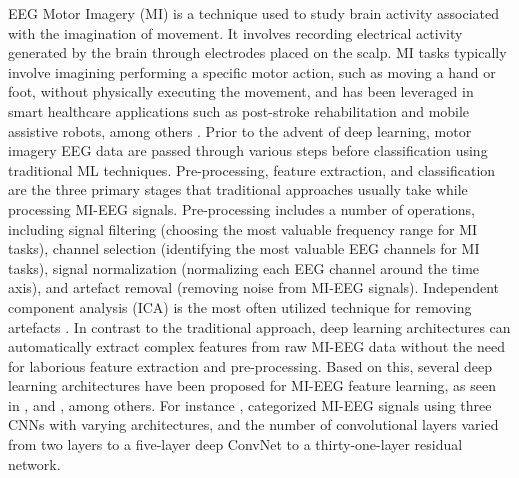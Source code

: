 \documentclass[preprint,12pt]{elsarticle}
\begin{document}
EEG Motor Imagery (MI) is a technique used to study brain activity associated with the imagination of movement. It involves recording electrical activity generated by the brain through electrodes placed on the scalp. MI tasks typically involve imagining performing a specific motor action, such as moving a hand or foot, without physically executing the movement, and has been leveraged in smart healthcare applications such as post-stroke rehabilitation and mobile assistive robots, among others \citep{altaheri2023deep}. Prior to the advent of deep learning, motor imagery EEG data are passed through various steps before classification using traditional ML techniques. Pre-processing, feature extraction, and classification are the three primary stages that traditional approaches usually take while processing MI-EEG signals. Pre-processing includes a number of operations, including signal filtering (choosing the most valuable frequency range for MI tasks), channel selection (identifying the most valuable EEG channels for MI tasks), signal normalization (normalizing each EEG channel around the time axis), and artefact removal (removing noise from MI-EEG signals). Independent component analysis (ICA) is the most often utilized technique for removing artefacts \citep{brunner2007spatial, delorme2007enhanced, jafarifarmand2019eeg}. In contrast to the traditional approach, deep learning architectures can automatically extract complex features from raw MI-EEG data without the need for laborious feature extraction and pre-processing. Based on this, several deep learning architectures have been proposed for MI-EEG feature learning, as seen in \citep{zhang2019novel}, \citep{kumar2016deep} and \citep{tibrewal2022}, among others. For instance \citep{Schirrmeister2017}, categorized MI-EEG signals using three CNNs with varying architectures, and the number of convolutional layers varied from two layers to a five-layer deep ConvNet to a thirty-one-layer residual network.
\end{document}
